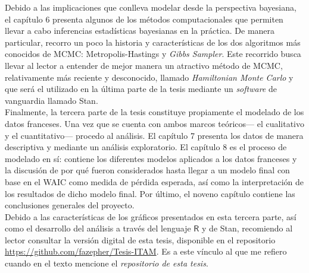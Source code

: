 Debido a las implicaciones que conlleva modelar desde la perspectiva bayesiana, el capítulo 6 presenta algunos de los métodos computacionales que permiten llevar a cabo inferencias estadísticas bayesianas en la práctica. De manera particular, recorro un poco la historia y características de los dos algoritmos más conocidos de MCMC: Metropolis-Hastings y \textit{Gibbs Sampler}. Este recorrido busca llevar al lector a entender de mejor manera un atractivo método de MCMC, relativamente más reciente y desconocido, llamado \textit{Hamiltonian Monte Carlo} y que será el utilizado en la última parte de la tesis mediante un \textit{software} de vanguardia llamado Stan.\\

Finalmente, la tercera parte de la tesis constituye propiamente el modelado de los datos franceses. Una vez que se cuenta con ambos marcos teóricos--- el cualitativo y el cuantitativo--- procedo al análisis. El capítulo 7 presenta los datos de manera descriptiva y mediante un análisis exploratorio. El capítulo 8 es el proceso de modelado en sí: contiene los diferentes modelos aplicados a los datos franceses y la discusión de por qué fueron considerados hasta llegar a un modelo final con base en el WAIC como medida de pérdida esperada, así como la interpretación de los resultados de dicho modelo final. Por último, el noveno capítulo contiene las conclusiones generales del proyecto.\\ 

Debido a las características de los gráficos presentados en esta tercera parte, así como el desarrollo del análisis a través del lenguaje $\mathsf{R}$ y de Stan, recomiendo al lector consultar la versión digital de esta tesis, disponible en el repositorio \url{https://github.com/fazepher/Tesis-ITAM}. Es a este vínculo al que me refiero cuando en el texto mencione el \textit{repositorio de esta tesis}.
